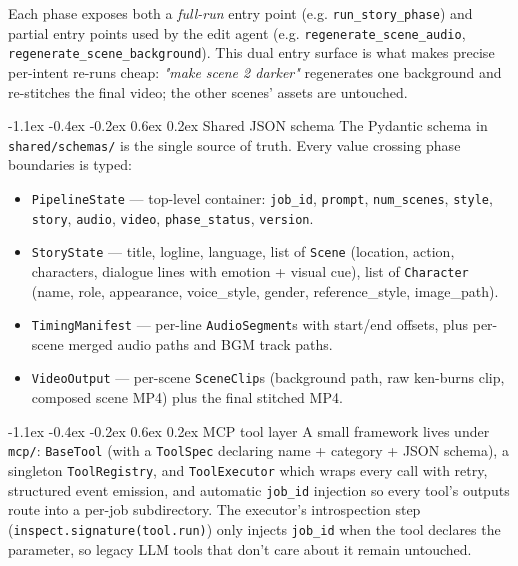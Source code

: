 \documentclass[11pt,a4paper]{article}
\makeatletter
\renewcommand\subsection{\@startsection{subsection}{2}{\z@}%
   {-1.1ex \@plus -0.4ex \@minus -0.2ex}%
   {0.6ex \@plus 0.2ex}%
   {\large\bfseries\color{accent!85!black}}}
\newcommand{\code}[1]{\texttt{\small #1}}
\makeatother
\begin{document}
Each phase exposes both a \emph{full-run} entry point (e.g. \code{run\_story\_phase})
and partial entry points used by the edit agent (e.g.
\code{regenerate\_scene\_audio}, \code{regenerate\_scene\_background}). This dual
entry surface is what makes precise per-intent re-runs cheap: \emph{"make scene 2
darker"} regenerates one background and re-stitches the final video; the other
scenes' assets are untouched.

\subsection{Shared JSON schema}
The Pydantic schema in \code{shared/schemas/} is the single source of truth.
Every value crossing phase boundaries is typed:

\begin{itemize}
  \item \code{PipelineState} --- top-level container: \code{job\_id}, \code{prompt},
        \code{num\_scenes}, \code{style}, \code{story}, \code{audio}, \code{video},
        \code{phase\_status}, \code{version}.
  \item \code{StoryState} --- title, logline, language, list of \code{Scene}
        (location, action, characters, dialogue lines with emotion + visual cue),
        list of \code{Character} (name, role, appearance, voice\_style, gender,
        reference\_style, image\_path).
  \item \code{TimingManifest} --- per-line \code{AudioSegment}s with start/end
        offsets, plus per-scene merged audio paths and BGM track paths.
  \item \code{VideoOutput} --- per-scene \code{SceneClip}s (background path, raw
        ken-burns clip, composed scene MP4) plus the final stitched MP4.
\end{itemize}

\subsection{MCP tool layer}
A small framework lives under \code{mcp/}: \code{BaseTool} (with a \code{ToolSpec}
declaring name + category + JSON schema), a singleton \code{ToolRegistry}, and
\code{ToolExecutor} which wraps every call with retry, structured event emission,
and automatic \code{job\_id} injection so every tool's outputs route into a
per-job subdirectory. The executor's introspection step
(\code{inspect.signature(tool.run)}) only injects \code{job\_id} when the tool
declares the parameter, so legacy LLM tools that don't care about it remain
untouched.
\end{document}

